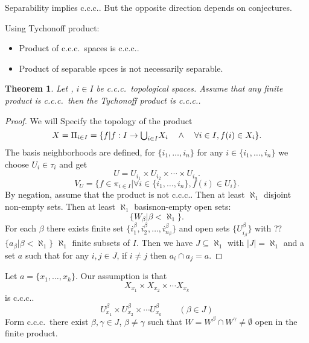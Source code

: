 \documentclass[11pt,pdftex,twoside,a4paper]{article}
\newcommand{\ccc}{c.c.c.}
\newtheorem{thm}{Theorem}[section]
\theoremstyle{definition}
\begin{document}
Separability implies \ccc. But the opposite direction depends
on conjectures.

Using Tychonoff product:
\begin{itemize}
\item Product of \ccc\ spaces is \ccc.
\item Product of separable spces is not necessarily separable.
\end{itemize}

\begin{thm}
Let , \(i\in I\) be \ccc\ topological spaces.
Assume that any finite product is \ccc\ then
the Tychonoff product  is \ccc.
\end{thm}
\begin{proof}
We will Specify the  topology of the product
\begin{equation*}
X = \Pi_{i\in I} = \{f | 
  f: I \to\mathsmaller{\bigcup_{i\in I}} X_i
  \quad\land\quad \forall i\in I, f(i)\in X_i\}.
\end{equation*}
The basis neighborhoods are defined, for \(\{i_1,\ldots,i_n\}\)
for any \(i \in \{i_1,\ldots,i_n\}\)
we choose \(U_i \in \tau_i\) and get
\begin{equation*}
 U = U_{i_1} \times U_{i_2} \times \cdots \times U_{i_n}.
\end{equation*}
\begin{equation*}
 V_U = \{f \in \pi_{i\in I}| \forall i \in \{i_1,\ldots,i_n\}, f(i)\in U_i\}.
\end{equation*}
By negation, assume that the product is not \ccc.
Then at least \(\aleph_1\) disjoint non-empty sets.
Then at least \(\aleph_1\) basisnon-empty open sets:
\begin{equation*}
 \{W_\beta | \beta < \aleph_1\}.
\end{equation*}
For each \(\beta\) there exists finite set
\(\{i_1^\beta, i_2^\beta, \ldots, i_{n_\beta}^\beta\}\)
and open sets \(\{U_{i_\beta}^\beta\}\)
with ??  \(\{a_\beta | \beta < \aleph_1\}\)
\(\aleph_1\) finite subsets of $I$.
Then we have \(J \subseteq \aleph_1\) with \(|J|=\aleph_1\)
and a set $a$ such that for any \(i,j\in J\), 
if \(i\neq j\) then \(a_i \cap a_j = a\).
\end{proof}

Let \(a = \{x_1,\ldots,x_k\}\). Our assumption is that
\begin{equation*}
X_{x_1} \times X_{x_2} \times \cdots X_{x_k}
\end{equation*}
is \ccc.
\begin{equation*}
U_{x_1}^\beta \times U_{x_2}^\beta \times \cdots U_{x_k}^\beta \qquad (\beta \in J)
\end{equation*}
Form \ccc\ there exist \(\beta,\gamma \in J\), \(\beta\neq\gamma\)
such that \(W = W^\beta \cap W^\gamma \neq \emptyset\)
open in the finite product.
\end{document}
